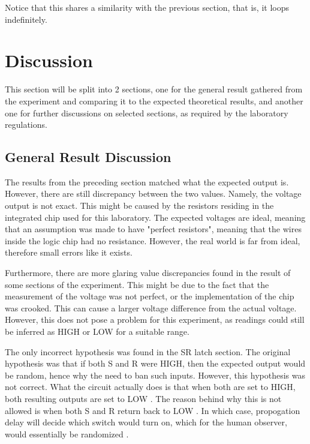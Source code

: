 \documentclass{report}
\begin{document}
	Notice that this shares a similarity with the previous section, that is, it loops indefinitely.
	
\section{Discussion}
	This section will be split into 2 sections, one for the general result gathered from the experiment and comparing it to the expected theoretical results, and another one for further discussions on selected sections, as required by the laboratory regulations.

	\subsection{General Result Discussion}
		The results from the preceding section matched what the expected output is. However, there are still discrepancy between the two values. Namely, the voltage output is not exact. This might be caused by the resistors residing in the integrated chip used for this laboratory. The expected voltages are ideal, meaning that an assumption was made to have "perfect resistors", meaning that the wires inside the logic chip had no resistance. However, the real world is far from ideal, therefore small errors like it exists.

		Furthermore, there are more glaring value discrepancies found in the result of some sections of the experiment. This might be due to the fact that the measurement of the voltage was not perfect, or the implementation of the chip was crooked. This can cause a larger voltage difference from the actual voltage. However, this does not pose a problem for this experiment, as readings could still be inferred as HIGH or LOW for a suitable range.

		The only incorrect hypothesis was found in the SR latch section. The original hypothesis was that if both S and R were HIGH, then the expected output would be random, hence why the need to ban such inputs. However, this hypothesis was not correct. What the circuit actually does is that when both are set to HIGH, both resulting outputs are set to LOW \autocite{neil_ukAnswerWhatActually2017}. The reason behind why this is not allowed is when both S and R return back to LOW \autocite{neil_ukAnswerWhatActually2017}. In which case, propogation delay will decide which switch would turn on, which for the human observer, would essentially be randomized \autocite{neil_ukAnswerWhatActually2017}. 
\end{document}

